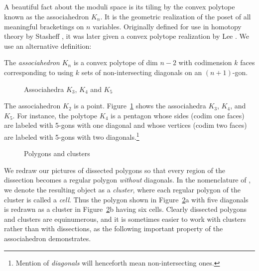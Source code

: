 \documentclass[10pt]{amsart}
\begin{document}
\subsection{}
A beautiful fact about the moduli space is its tiling by the convex polytope known as the associahedron $K_n$.  It is the geometric realization of the poset of all meaningful bracketings on $n$ variables.  Originally defined for use in homotopy theory by Stasheff \cite[\S2]{jds}, it was later given a convex polytope realization by Lee \cite{lee}. We use an alternative definition:

\begin{defn}
The {\em associahedron} $K_n$ is a convex polytope of dim $n-2$ with codimension $k$ faces corresponding to using $k$ sets of non-intersecting diagonals on an $(n+1)$-gon.
\end{defn}

\begin{figure}[h]
\caption{Associahedra $K_3$, $K_4$ and $K_5$}
\label{k3k4k5}
\end{figure}

\begin{exmp}
The associahedron $K_2$ is a point. Figure~\ref{k3k4k5} shows the associahedra $K_3$, $K_4$, and $K_5$. For instance, the polytope $K_4$ is a pentagon whose sides (codim one faces) are labeled with 5-gons with one diagonal and whose vertices (codim two faces) are labeled with 5-gons with two diagonals.\footnote{Mention of {\em diagonals} will henceforth mean non-intersecting ones.} 
\end{exmp}

\begin{figure}[h]
\caption{Polygons and clusters}
\label{cluster}
\end{figure}

We redraw our pictures of dissected polygons so that every region of the dissection becomes a regular polygon {\em without} diagonals. In the nomenclature of \cite{r1}, we denote the resulting object as a {\em cluster}, where each regular polygon of the cluster is called a {\em cell}. Thus the polygon shown in Figure~\ref{cluster}a with five diagonals is redrawn as a cluster in Figure~\ref{cluster}b having six cells. Clearly dissected polygons and clusters are equinumerous, and it is sometimes easier to work with clusters rather than with dissections, as the following important property of the associahedron demonstrates.
\end{document}
